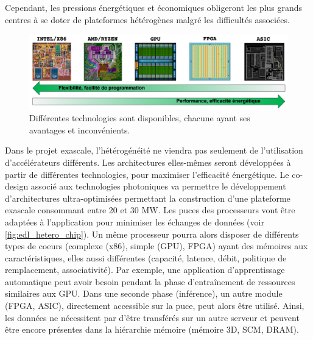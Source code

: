         Cependant, les pressions énergétiques et économiques obligeront les plus grands centres à se doter de plateformes hétérogènes malgré les difficultés associées. 
        
        \begin{figure}
        \center
        \includegraphics[width=17cm]{images/edl_many_techno.png}
        \caption{\label{fig:edl_many_techno} Différentes technologies sont disponibles, chacune ayant ses avantages et inconvénients.}
        \end{figure}
            
        Dans le projet \gls{exascale}, l'hétérogénéité ne viendra pas seulement de l'utilisation d'accélérateurs différents. Les architectures elles-mêmes seront développées à partir de différentes technologies, pour maximiser l'efficacité énergétique. Le co-design associé aux technologies photoniques va permettre le développement d'architectures ultra-optimisées permettant la construction d'une plateforme \gls{exascale} consommant entre 20 et 30 MW. Les puces des processeurs vont être adaptées à l'application pour minimiser les échanges de données (voir \autoref{fig:edl_hetero_chip}). Un même processeur pourra alors disposer de différents types de coeurs (complexe (x86), simple (GPU), FPGA) ayant des mémoires aux caractéristiques, elles aussi différentes (capacité, latence, débit, politique de remplacement, associativité).  Par exemple, une application d'apprentissage automatique peut avoir besoin pendant la phase d'entraînement de ressources similaires aux GPU. Dans une seconde phase (inférence), un autre module (FPGA, ASIC), directement accessible sur la puce, peut alors être utilisé. Ainsi, les données ne nécessitent par d’être transférés sur un autre serveur et peuvent être encore présentes dans la hiérarchie mémoire (mémoire 3D, SCM, DRAM).
        
